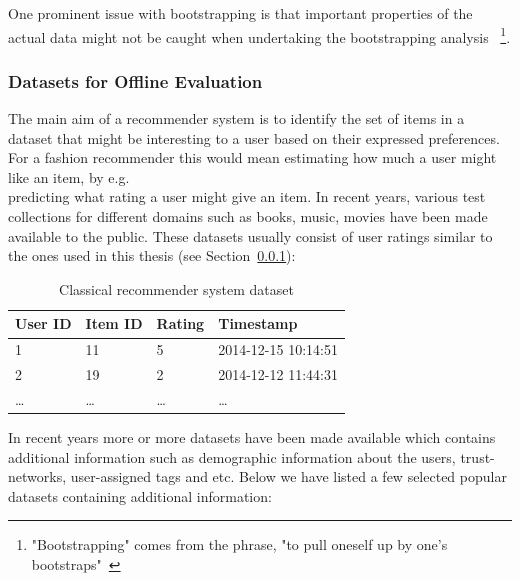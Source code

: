 One prominent issue with bootstrapping is that important properties of the
actual data might not be caught when undertaking the bootstrapping analysis
~\footnote{"Bootstrapping" comes from the phrase, "to pull oneself up by one's
bootstraps"~\cite{bootstrapSaying1843}}.

\subsubsection{Datasets for Offline Evaluation}
The main aim of a recommender system is to identify the set of items in a
dataset that might be interesting to a user based on their expressed
preferences. For a fashion recommender this would mean estimating how much a
user might like an item, by e.g.\\ predicting what rating a user might give an
item. In recent years, various test collections for different domains such as
books, music, movies have been made available to the public. These datasets
usually consist of user ratings similar to the ones used in this thesis (see
Section~\ref{}):

\begin{table}[H]
\centering
	\begin{tabular}{*{4}l}
	\toprule
		User ID & Item ID & Rating & Timestamp \\ \midrule
		1		  &	11	  &	5	    &  2014-12-15 10:14:51  \\
		2		  &	19	  &	2	    &  2014-12-12 11:44:31  \\
		\dots &	\dots &	\dots &  \dots                \\
	\bottomrule
	\end{tabular}
\caption{Classical recommender system dataset}
\end{table}

In recent years more or more datasets have been made available which contains
additional information such as demographic information about the users,
trust-networks, user-assigned tags and etc. Below we have listed a few selected
popular datasets containing additional information:

